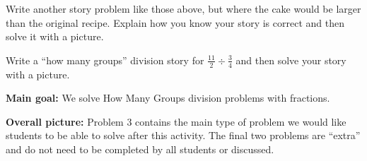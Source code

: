 \documentclass[nooutcomes,noauthor]{ximera}
\begin{document}
\begin{problem}
Write another story problem like those above, but where the cake would be larger than the original recipe. Explain how you know your story is correct and then solve it with a picture.
\end{problem}



\begin{problem}
Write a ``how many groups'' division story for $\frac{11}{2} \div \frac{3}{4}$ and then solve your story with a picture.
\end{problem}




\newpage

\begin{instructorNotes} 



{\bf Main goal:} We solve How Many Groups division problems with fractions.


{\bf Overall picture:} Problem 3 contains the main type of problem we would like students to be able to solve after this activity. The final two problems are ``extra'' and do not need to be completed by all students or discussed.


\end{instructorNotes}
\end{document}
